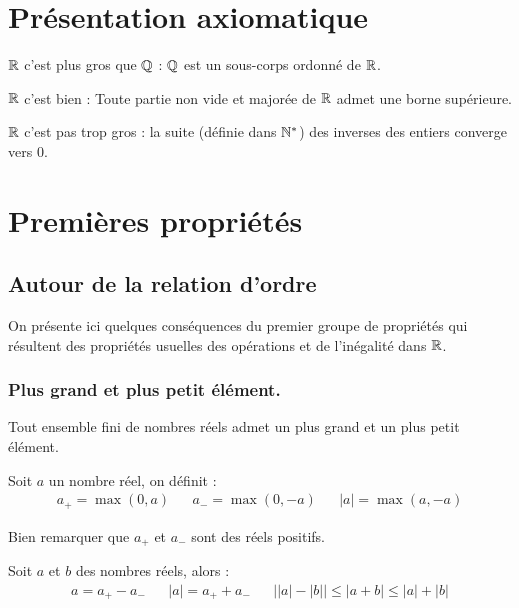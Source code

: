 \section{Présentation axiomatique}
\begin{pa}
 \item[$\mathbb{R}$ c'est plus gros que $\mathbb{Q}$] : $\mathbb{Q}$ est un sous-corps ordonné de  $\mathbb{R}$.
 \item[$\mathbb{R}$ c'est bien] : Toute partie non vide et majorée de $\mathbb{R}$ admet une borne supérieure.
 \item[$\mathbb{R}$ c'est pas trop gros] : la suite (définie dans $\mathbb{N}^*$) des inverses des entiers converge vers $0$.
\end{pa}

\section{Premières propriétés}
\subsection{Autour de la relation d'ordre}
On présente ici quelques conséquences du premier groupe de propriétés qui résultent des propriétés usuelles des opérations et de l'inégalité dans $\mathbb{R}$.
\subsubsection{Plus grand et plus petit élément.}
Tout ensemble fini de nombres réels admet un plus grand et un plus petit élément.
\begin{defi}
 Soit $a$ un nombre réel, on définit :
\begin{align*}
 a_+ = \max(0,a) & & a_- = \max(0,-a) & & |a| = \max(a,-a)
\end{align*}
\end{defi}
Bien remarquer que $a_+$ et $a_-$ sont des réels positifs.
\begin{prop}
 Soit $a$ et $b$ des nombres réels, alors :
\begin{align*}
 a = a_+ - a_- & & |a| = a_+  + a_- & & \left\vert |a|-|b|\right\vert \leq |a+b| \leq |a| + |b|
\end{align*}
\end{prop}

